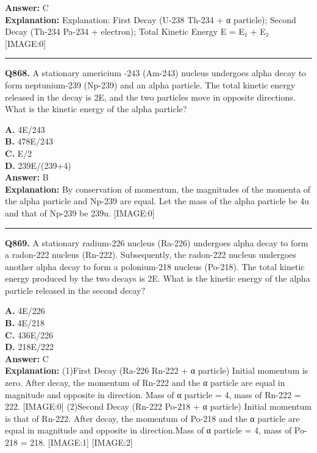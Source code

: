 \documentclass[12pt]{article}
\begin{document}
\textbf{Answer:} C \\
\textbf{Explanation:} Explanation: First Decay (U-238 \to  Th-234 + α particle); Second Decay (Th-234 \to  Pa-234 + electron); Total Kinetic Energy E = E₁ + E₂
[IMAGE:0]

\hrule
\vspace{1em}


\noindent
\textbf{Q868.} A stationary americium -243 (Am-243) nucleus undergoes alpha decay to form neptunium-239 (Np-239) and an alpha particle. The total kinetic energy released in the decay is 2E, and the two particles move in opposite directions. What is the kinetic energy of the alpha particle?



\textbf{A.} 4E/243 \\
\textbf{B.} 478E/243 \\
\textbf{C.} E/2 \\
\textbf{D.} 239E/(239+4) \\

\textbf{Answer:} B \\
\textbf{Explanation:} By conservation of momentum, the magnitudes of the momenta of the alpha particle and Np-239 are equal. Let the mass of the alpha particle be 4u and that of Np-239 be 239u.
[IMAGE:0]

\hrule
\vspace{1em}


\noindent
\textbf{Q869.} A stationary radium-226 nucleus (Ra-226) undergoes alpha decay to form a radon-222 nucleus (Rn-222). Subsequently, the radon-222 nucleus undergoes another alpha decay to form a polonium-218 nucleus (Po-218). The total kinetic energy produced by the two decays is 2E. What is the kinetic energy of the alpha particle released in the second decay?



\textbf{A.} 4E​/226 \\
\textbf{B.} 4E​/218 \\
\textbf{C.} 436E​/226 \\
\textbf{D.} 218E​/222 \\

\textbf{Answer:} C \\
\textbf{Explanation:} (1)First Decay (Ra-226 \to  Rn-222 + α particle)
Initial momentum is zero. After decay, the momentum of Rn-222 and the α particle are equal in magnitude and opposite in direction. Mass of α particle = 4, mass of Rn-222 = 222.
[IMAGE:0]
(2)Second Decay (Rn-222 \to  Po-218 + α particle)
Initial momentum is that of Rn-222. After decay, the momentum of Po-218 and the α particle are equal in magnitude and opposite in direction.Mass of α particle = 4, mass of Po-218 = 218.
[IMAGE:1]
[IMAGE:2]
\end{document}
